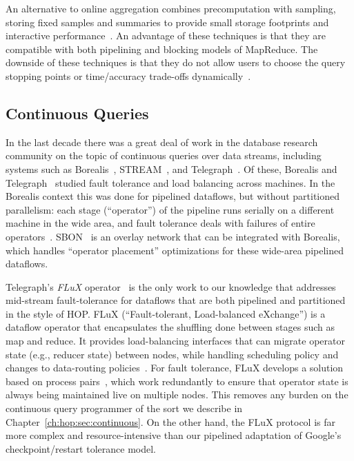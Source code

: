 An alternative to online aggregation combines precomputation with sampling,
storing fixed samples and summaries to provide small storage footprints and
interactive performance~\cite{gibbons98new}.  An advantage of these techniques
is that they are compatible with both pipelining and blocking models of
MapReduce.  The downside of these techniques is that they do not allow users to
choose the query stopping points or time/accuracy trade-offs
dynamically~\cite{ieeecontrol}.

\subsection{Continuous Queries}

In the last decade there was a great deal of work in the database research
community on the topic of continuous queries over data streams, including
systems such as Borealis~\cite{borealis}, STREAM~\cite{stream}, and
Telegraph~\cite{tcq-cidr}.  Of these, Borealis and Telegraph~\cite{flux-ft}
studied fault tolerance and load balancing across machines.  In the Borealis
context this was done for pipelined dataflows, but without partitioned
parallelism: each stage (``operator'') of the pipeline runs serially on a
different machine in the wide area, and fault tolerance deals with failures of
entire operators~\cite{borealisFT}.  SBON~\cite{sbon} is an overlay network
that can be integrated with Borealis, which handles ``operator placement''
optimizations for these wide-area pipelined dataflows.

Telegraph's {\em FLuX} operator~\cite{flux-ft,flux-lb} is the only work to our
knowledge that addresses mid-stream fault-tolerance for dataflows that are both
pipelined and partitioned in the style of HOP\@.  FLuX (``Fault-tolerant,
Load-balanced eXchange'') is a dataflow operator that encapsulates the
shuffling done between stages such as map and reduce.  It provides
load-balancing interfaces that can migrate operator state (e.g., reducer state)
between nodes, while handling scheduling policy and changes to data-routing
policies~\cite{flux-lb}.  For fault tolerance, FLuX develops a solution based
on process pairs~\cite{flux-ft}, which work redundantly to ensure that operator
state is always being maintained live on multiple nodes.  This removes any
burden on the continuous query programmer of the sort we describe in
Chapter~\ref{ch:hop:sec:continuous}.  On the other hand, the FLuX protocol is
far more complex and resource-intensive than our pipelined adaptation of
Google's checkpoint/restart tolerance model.

